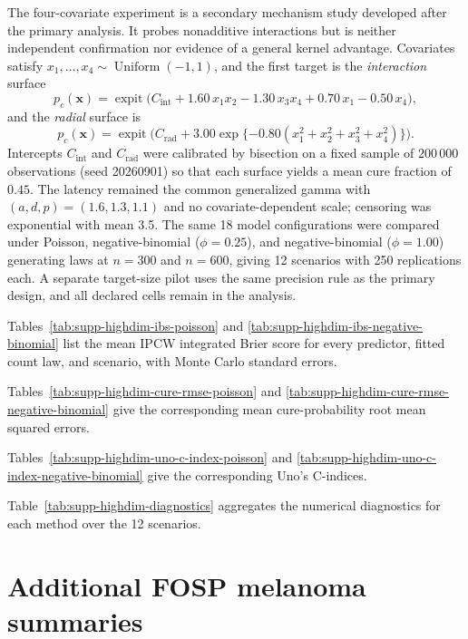 \documentclass[11pt]{article}
\begin{document}
The four-covariate experiment is a secondary mechanism study developed after the primary analysis. It probes nonadditive interactions but is neither independent confirmation nor evidence of a general kernel advantage. Covariates satisfy $x_1,\dots,x_4\sim\operatorname{Uniform}(-1,1)$, and the first target is the \emph{interaction} surface
\begin{equation}
p_c(\bm{x})=\operatorname{expit}\bigl(C_{\mathrm{int}}+1.60\,x_1x_2-1.30\,x_3x_4+0.70\,x_1-0.50\,x_4\bigr),
\end{equation}
and the \emph{radial} surface is
\begin{equation}
p_c(\bm{x})=\operatorname{expit}\bigl(C_{\mathrm{rad}}+3.00\exp\{-0.80(x_1^2+x_2^2+x_3^2+x_4^2)\}\bigr).
\end{equation}
Intercepts $C_{\mathrm{int}}$ and $C_{\mathrm{rad}}$ were calibrated by bisection on a fixed sample of $200\,000$ observations (seed 20260901) so that each surface yields a mean cure fraction of $0.45$. The latency remained the common generalized gamma with $(a,d,p)=(1.6,1.3,1.1)$ and no covariate-dependent scale; censoring was exponential with mean 3.5. The same 18 model configurations were compared under Poisson, negative-binomial ($\phi=0.25$), and negative-binomial ($\phi=1.00$) generating laws at $n=300$ and $n=600$, giving 12 scenarios with 250 replications each. A separate target-size pilot uses the same precision rule as the primary design, and all declared cells remain in the analysis.

Tables~\ref{tab:supp-highdim-ibs-poisson} and \ref{tab:supp-highdim-ibs-negative-binomial} list the mean IPCW integrated Brier score for every predictor, fitted count law, and scenario, with Monte Carlo standard errors.


Tables~\ref{tab:supp-highdim-cure-rmse-poisson} and \ref{tab:supp-highdim-cure-rmse-negative-binomial} give the corresponding mean cure-probability root mean squared errors.


Tables~\ref{tab:supp-highdim-uno-c-index-poisson} and \ref{tab:supp-highdim-uno-c-index-negative-binomial} give the corresponding Uno's C-indices.


Table~\ref{tab:supp-highdim-diagnostics} aggregates the numerical diagnostics for each method over the 12 scenarios.

\section{Additional FOSP melanoma summaries}\label{sec:supp-fosp-melanoma}
\end{document}
